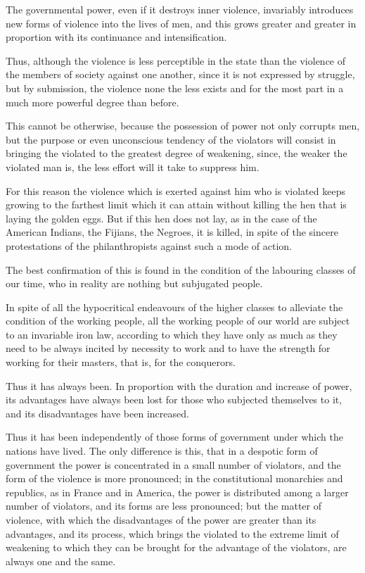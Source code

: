 \documentclass{book}
\begin{document}
The governmental power, even if it destroys inner violence, invariably introduces new forms of violence into the lives of men, and this grows greater and greater in proportion with its continuance and intensification.

Thus, although the violence is less perceptible in the state than the violence of the members of society against one another, since it is not expressed by struggle, but by submission, the violence none the less exists and for the most part in a much more powerful degree than before.

This cannot be otherwise, because the possession of power not only corrupts men, but the purpose or even unconscious tendency of the violators will consist in bringing the violated to the greatest degree of weakening, since, the weaker the violated man is, the less effort will it take to suppress him.

For this reason the violence which is exerted against him who is violated keeps growing to the farthest limit which it can attain without killing the hen that is laying the golden eggs. But if this hen does not lay, as in the case of the American Indians, the Fijians, the Negroes, it is killed, in spite of the sincere protestations of the philanthropists against such a mode of action.

The best confirmation of this is found in the condition of the labouring classes of our time, who in reality are nothing but subjugated people.

In spite of all the hypocritical endeavours of the higher classes to alleviate the condition of the working people, all the working people of our world are subject to an invariable iron law, according to which they have only as much as they need to be always incited by necessity to work and to have the strength for working for their masters, that is, for the conquerors.

Thus it has always been. In proportion with the duration and increase of power, its advantages have always been lost for those who subjected themselves to it, and its disadvantages have been increased.

Thus it has been independently of those forms of government under which the nations have lived. The only difference is this, that in a despotic form of government the power is concentrated in a small number of violators, and the form of the violence is more pronounced; in the constitutional monarchies and republics, as in France and in America, the power is distributed among a larger number of violators, and its forms are less pronounced; but the matter of violence, with which the disadvantages of the power are greater than its advantages, and its process, which brings the violated to the extreme limit of weakening to which they can be brought for the advantage of the violators, are always one and the same.
\end{document}
